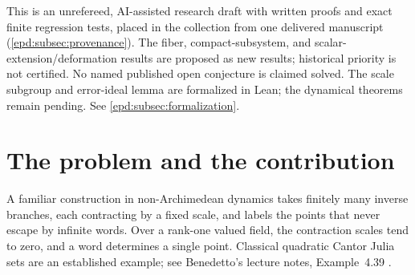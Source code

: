\documentclass[11pt,a4paper]{article}
\numberwithin{equation}{section}
\theoremstyle{plain}
\theoremstyle{definition}
\theoremstyle{remark}
\newcommand{\No}{\mathbf{No}}
\newcommand{\smallbox}[2]{\begin{tcolorbox}[colback=soft,colframe=ink,
 boxrule=0.4pt,arc=1mm,title={#1},fonttitle=\bfseries]#2\end{tcolorbox}}
\begin{document}
\begin{titlepage}
\begin{abstract}
This gives an exact distinction between a Cantor repeller and a system
with open infinitesimal fibers. The distinction is whether the expansion
scale $\kappa$ is an order unit of $\Gamma$, not valuation rank alone.
When $\kappa$ is not an order unit the
iterate family is uniformly equicontinuous on the integral nonescaping
set, and every compact forward-invariant subset is finite, although the
scale quotient is the full shift. Every preperiodic point is a canonical
center, and all preperiodicity polynomials split simply in the original
Hahn field. Scalar extension can therefore create entire itinerary
fibers without creating any preperiodic points. We also prove uniform
support-controlled deformation estimates, an exact formula for the
valuation-bounded orbit locus, and a polynomial equicontinuity theorem
when the value group has no order unit. The example
$F(x)=\omega(x^2-1)$ makes all the phenomena explicit inside $\No$ and
$\No[\mathrm i]$: its centers are real surreal numbers, and the fibers in
$\No$ are obtained by restricting to real infinitesimal errors. At the
level of the whole class $\No[\mathrm i]$, the discreteness and
compactness clauses are special cases of the collection's theorem that
every set is closed and discrete in the fine topology; the substance of
those clauses lies in set-sized Hahn workspaces.
\end{abstract}
\vfill
\smallbox{Status and scope}{This is an unrefereed, AI-assisted research
draft with written proofs and exact finite regression tests, placed in the
collection from one delivered manuscript (\cref{epd:subsec:provenance}).
The fiber, compact-subsystem,
and scalar-extension/deformation results are proposed as new results;
historical priority is not certified. No named published open conjecture
is claimed solved. The scale subgroup and error-ideal lemma are formalized in Lean;
the dynamical theorems remain pending. See \cref{epd:subsec:formalization}.}
\end{titlepage}
\hypersetup{pageanchor=true}
\begingroup
\small
\setlength{\parskip}{0pt}
\tableofcontents
\endgroup
\clearpage
{}

\section{The problem and the contribution}
\label{epd:sec:intro}
A familiar construction in non-Archimedean dynamics takes finitely many
inverse branches, each contracting by a fixed scale, and labels the
points that never escape by infinite words. Over a rank-one valued field,
the contraction scales tend to zero, and a word determines a single
point. Classical quadratic Cantor Julia sets are an established example;
see Benedetto's lecture notes, Example~4.39 \cite{Benedetto}.
\end{document}
